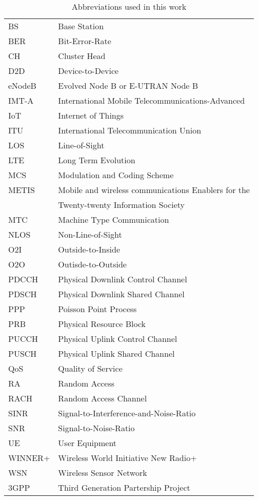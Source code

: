 \begin{table}[h]
\begin{tabular}{ll}
BS & Base Station\\
BER & Bit-Error-Rate\\
CH & Cluster Head\\
D2D & Device-to-Device\\
eNodeB & Evolved Node B or E-UTRAN Node B\\
IMT-A & International Mobile Telecommunications-Advanced\\
IoT & Internet of Things\\
ITU & International Telecommunication Union\\
LOS & Line-of-Sight\\
LTE & Long Term Evolution\\
MCS & Modulation and Coding Scheme\\
METIS & Mobile and wireless communications Enablers for the\\ 
 & Twenty-twenty Information Society \\
MTC & Machine Type Communication\\
NLOS & Non-Line-of-Sight\\
O2I & Outside-to-Inside\\
O2O & Outisde-to-Outside\\
PDCCH & Physical Downlink Control Channel\\
PDSCH & Physical Downlink Shared Channel\\
PPP & Poisson Point Process\\
PRB & Physical Resource Block\\
PUCCH & Physical Uplink Control Channel\\
PUSCH & Physical Uplink Shared Channel\\
QoS & Quality of Service\\
RA & Random Access\\
RACH & Random Access Channel\\
SINR & Signal-to-Interference-and-Noise-Ratio\\
SNR & Signal-to-Noise-Ratio\\ 
UE & User Equipment\\
WINNER+ & Wireless World Initiative New Radio+ \\
WSN & Wireless Sensor Network\\
3GPP & Third Generation Partership Project\\
\end{tabular}
\caption{Abbreviations used in this work}
\end{table}

